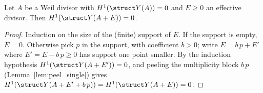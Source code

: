 \begin{lemma}
  \label{lem:peel_effective}
  \leanok
  Let \(A\) be a Weil divisor with \(H^1(\struct Y(A)) = 0\) and \(E \ge 0\) an effective
  divisor. Then \(H^1(\struct Y(A + E)) = 0\).
\end{lemma}
\begin{proof}
  \leanok
  Induction on the size of the (finite) support of \(E\). If the support is empty, \(E = 0\).
  Otherwise pick \(p\) in the support, with coefficient \(b > 0\); write
  \(E = b\,p + E'\) where \(E' = E - b\,p \ge 0\) has support one point smaller. By the
  induction hypothesis \(H^1(\struct Y(A + E')) = 0\), and peeling the multiplicity block
  \(b \, p\) (Lemma~\ref{lem:peel_single}) gives \(H^1(\struct Y(A + E' + b\,p)) =
  H^1(\struct Y(A + E)) = 0\).
\end{proof}

